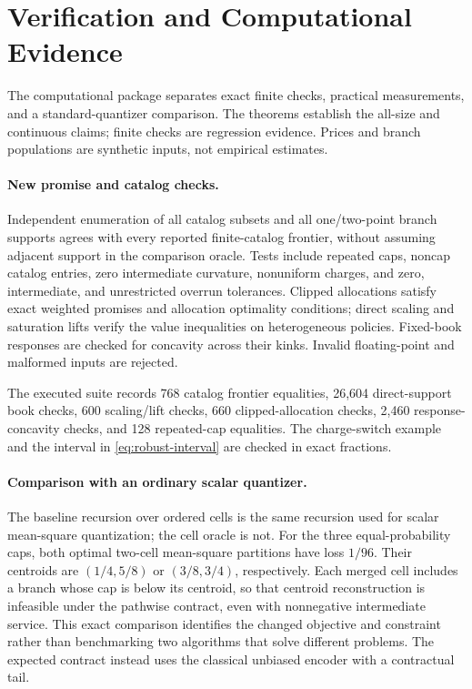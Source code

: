 \section{Verification and Computational Evidence}\label{sec:r37-evidence}
The computational package separates exact finite checks, practical measurements, and a standard-quantizer comparison. The theorems establish the all-size and continuous claims; finite checks are regression evidence. Prices and branch populations are synthetic inputs, not empirical estimates.

\paragraph{New promise and catalog checks.}
Independent enumeration of all catalog subsets and all one/two-point branch supports agrees with every reported finite-catalog frontier, without assuming adjacent support in the comparison oracle. Tests include repeated caps, noncap catalog entries, zero intermediate curvature, nonuniform charges, and zero, intermediate, and unrestricted overrun tolerances. Clipped allocations satisfy exact weighted promises and allocation optimality conditions; direct scaling and saturation lifts verify the value inequalities on heterogeneous policies. Fixed-book responses are checked for concavity across their kinks. Invalid floating-point and malformed inputs are rejected.

The executed suite records 768 catalog frontier equalities, 26,604 direct-support book checks, 600 scaling/lift checks, 660 clipped-allocation checks, 2,460 response-concavity checks, and 128 repeated-cap equalities. The charge-switch example and the interval in \eqref{eq:robust-interval} are checked in exact fractions.

\paragraph{Comparison with an ordinary scalar quantizer.}
The baseline recursion over ordered cells is the same recursion used for scalar mean-square quantization; the cell oracle is not. For the three equal-probability caps, both optimal two-cell mean-square partitions have loss $1/96$. Their centroids are $(1/4,5/8)$ or $(3/8,3/4)$, respectively. Each merged cell includes a branch whose cap is below its centroid, so that centroid reconstruction is infeasible under the pathwise contract, even with nonnegative intermediate service. This exact comparison identifies the changed objective and constraint rather than benchmarking two algorithms that solve different problems. The expected contract instead uses the classical unbiased encoder with a contractual tail.

